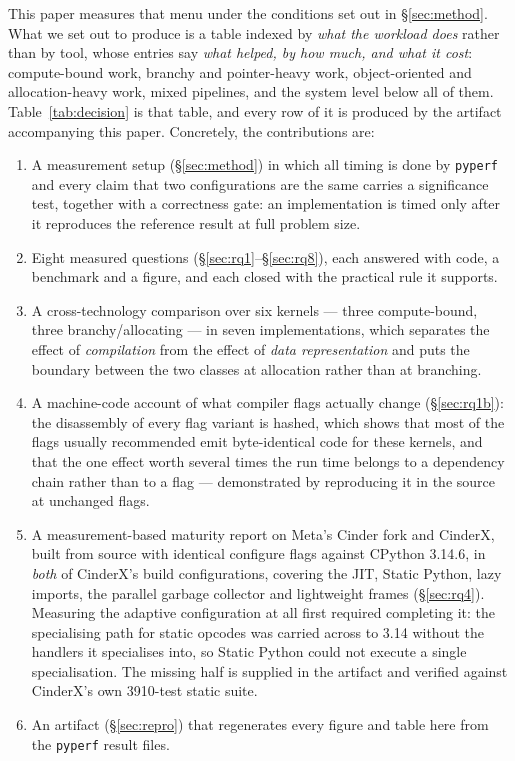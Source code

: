 \documentclass[10pt,a4paper]{article}
\newcommand{\code}[1]{\texttt{\small #1}}
\begin{document}
This paper measures that menu under the conditions set out in \S\ref{sec:method}. What we set
out to produce is a table indexed by \emph{what the workload does} rather than by tool, whose
entries
say \emph{what helped, by how much, and what it cost}: compute-bound work, branchy and
pointer-heavy work, object-oriented and allocation-heavy work, mixed pipelines, and the
system level below all of them. Table~\ref{tab:decision} is that table, and every row of it
is produced by the artifact accompanying this paper. Concretely, the contributions are:

\begin{enumerate}[leftmargin=1.4em,itemsep=1pt]
  \item A measurement setup (\S\ref{sec:method}) in which all timing is done by
        \code{pyperf} and every claim that two configurations are the same carries a
        significance test, together with a correctness gate: an implementation is timed only
        after it reproduces the reference result at full problem size.
  \item Eight measured questions (\S\ref{sec:rq1}--\S\ref{sec:rq8}), each answered with
        code, a benchmark and a figure, and each closed with the practical rule it supports.
  \item A cross-technology comparison over six kernels --- three compute-bound, three
        branchy/allocating --- in seven implementations, which separates the effect of
        \emph{compilation} from the effect of \emph{data representation} and puts the
        boundary between the two classes at allocation rather than at branching.
  \item A machine-code account of what compiler flags actually change (\S\ref{sec:rq1b}):
        the disassembly of every flag variant is hashed, which shows that most of the flags
        usually recommended emit byte-identical code for these kernels, and that the one
        effect worth several times the run time belongs to a dependency chain rather than to
        a flag --- demonstrated by reproducing it in the source at unchanged flags.
  \item A measurement-based maturity report on Meta's Cinder fork and CinderX, built from
        source with identical configure flags against CPython 3.14.6, in \emph{both} of
        CinderX's build configurations, covering the JIT, Static Python, lazy imports, the
        parallel garbage collector and lightweight frames (\S\ref{sec:rq4}). Measuring the
        adaptive configuration at all first required completing it: the specialising path for
        static opcodes was carried across to 3.14 without the handlers it specialises into, so
        Static Python could not execute a single specialisation. The missing half is supplied
        in the artifact and verified against CinderX's own 3910-test static suite.
  \item An artifact (\S\ref{sec:repro}) that regenerates every figure and table here from the
        \code{pyperf} result files.
\end{enumerate}
\end{document}
